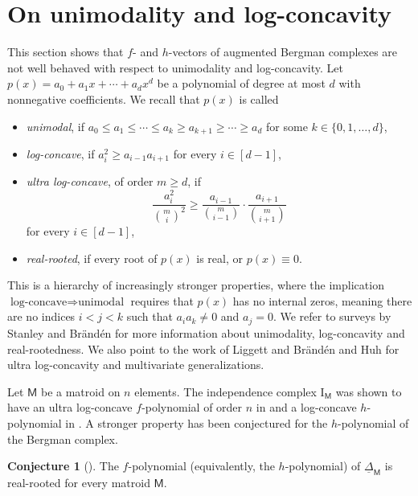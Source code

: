\documentclass[11pt]{amsart}
\theoremstyle{theorems}
\theoremstyle{definition}
\newtheorem{conjecture}[theorem]{Conjecture}
\newcommand{\M}{{\mathsf{M}}}
\newcommand{\I}{{\mathrm{I}}}
\newcommand{\uDelta}{\underline{\Delta}}
\begin{document}
\section{On unimodality and log-concavity}
\label{sec:log-concavity}

This section shows that $f$- and $h$-vectors of 
augmented Bergman complexes are not well behaved 
with respect to unimodality and log-concavity.
Let $p(x) = a_0 + a_1x + \cdots + a_d x^d$ be a 
polynomial of degree at most $d$ with nonnegative 
coefficients. We recall that $p(x)$ is called 
%
\begin{itemize}
\item[$\bullet$] 
  \emph{unimodal}, if $a_0 \le a_1 \le \cdots \le 
	a_k \ge a_{k+1} \ge \cdots \ge a_d$ for some $k \in
	\{0, 1,\dots,d\}$,
\item[$\bullet$] 
  \emph{log-concave}, if $a_i^2 \ge a_{i-1}a_{i+1}$ 
	for every $i \in [d-1]$,
	\item[$\bullet$] 
  \emph{ultra log-concave}, of order $m \ge d$, if
	\[ \frac{a_i^2}{\binom{m}{i}^2} \ge \frac{a_{i-1}}
	   {\binom{m}{i-1}} \cdot \frac{a_{i+1}}
		 {\binom{m}{i+1}} \]
  for every $i \in [d-1]$,
\item[$\bullet$] 
  \emph{real-rooted}, if every root of $p(x)$ is real, 
	or $p(x) \equiv 0$.
\end{itemize}
%
This is a hierarchy of increasingly stronger properties, 
where the implication $\text{log-concave} \Longrightarrow 
\text{unimodal}$ requires that $p(x)$ has no internal zeros, 
meaning there are no indices $i < j < k$ such that $a_i a_k 
\ne 0$ and $a_j = 0$. We refer to surveys by Stanley 
\cite{stanley-unimodality} and Br\"and\'en 
\cite{Bra15} for more information about unimodality, 
log-concavity and real-rootedness. We also point to the work 
of Liggett \cite{Lig97} and Br\"and\'en and Huh \cite{BH20}
for ultra log-concavity and multivariate generalizations.

Let $\M$ be a matroid on $n$ elements. The independence
complex $\I_{\M}$ was shown to have an ultra log-concave 
$f$-polynomial of order $n$ in \cite{BH20,ALOV24}
and a log-concave $h$-polynomial in \cite{AHK18}. A
stronger property has been conjectured for the 
$h$-polynomial of the Bergman complex.

\begin{conjecture}[\cite{AK23}] \label{conj:AKE}
The $f$-polynomial (equivalently, the $h$-polynomial) of 
$\uDelta_{\M}$ is real-rooted for every matroid $\M$.
\end{conjecture}
\end{document}

